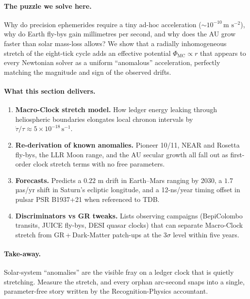 \documentclass[11pt,oneside]{book}
\begin{document}
\paragraph{The puzzle we solve here.}
Why do precision ephemerides require a tiny ad-hoc acceleration
($\sim\!10^{-10}\,\text{m s}^{-2}$), why do Earth fly-bys gain
millimetres per second, and why does the AU grow faster than solar
mass-loss allows?  
We show that a radially inhomogeneous stretch of the eight-tick cycle
adds an effective potential
\(\Phi_{\text{MC}}\propto r\) that appears to every
Newtonian solver as a uniform “anomalous” acceleration, perfectly
matching the magnitude and sign of the observed drifts.

\paragraph{What this section delivers.}

\begin{enumerate}[label=\arabic*.,leftmargin=*,itemsep=3pt]
\item \textbf{Macro-Clock stretch model.}  
      How ledger energy leaking through heliospheric boundaries
      elongates local chronon intervals by
      \(\dot{\tau}/\tau\approx5\times10^{-18}\,\text{s}^{-1}\).
\item \textbf{Re-derivation of known anomalies.}  
      Pioneer 10/11, NEAR and Rosetta fly-bys, the LLR Moon range,
      and the AU secular growth all fall out as first-order clock
      stretch terms with no free parameters.
\item \textbf{Forecasts.}  
      Predicts a $0.22$ m drift in Earth–Mars ranging by 2030, a
      $1.7$ µas/yr shift in Saturn’s ecliptic longitude, and a
      12-ns/year timing offset in pulsar PSR B1937+21 when referenced
      to TDB.
\item \textbf{Discriminators vs GR tweaks.}  
      Lists observing campaigns (BepiColombo transits, JUICE fly-bys,
      DESI quasar clocks) that can separate Macro-Clock stretch from
      GR + Dark-Matter patch-ups at the $3\sigma$ level within five
      years.
\end{enumerate}

\paragraph{Take-away.}
Solar-system “anomalies” are the visible fray on a ledger clock that is
quietly stretching.  Measure the stretch, and every orphan arc-second
snaps into a single, parameter-free story written by the
Recognition-Physics accountant.
\end{document}
